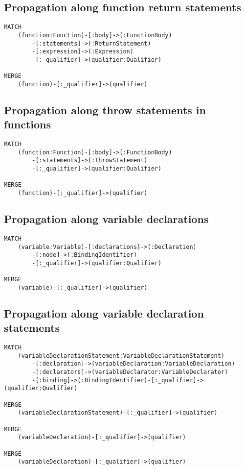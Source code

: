 \subsection{Propagation along function return statements}
\begin{lstlisting}[language=Cypher]
MATCH
    (function:Function)-[:body]->(:FunctionBody)
        -[:statements]->(:ReturnStatement)
        -[:expression]->(:Expression)
        -[:_qualifier]->(qualifier:Qualifier)

MERGE
    (function)-[:_qualifier]->(qualifier)
\end{lstlisting}


\subsection{Propagation along throw statements in functions}
\begin{lstlisting}[language=Cypher]
MATCH
    (function:Function)-[:body]->(:FunctionBody)
        -[:statements]->(:ThrowStatement)
        -[:_qualifier]->(qualifier:Qualifier)

MERGE
    (function)-[:_qualifier]->(qualifier)
\end{lstlisting}


\newpage
\subsection{Propagation along variable declarations}
\begin{lstlisting}[language=Cypher]
MATCH
    (variable:Variable)-[:declarations]->(:Declaration)
        -[:node]->(:BindingIdentifier)
        -[:_qualifier]->(qualifier:Qualifier)

MERGE
    (variable)-[:_qualifier]->(qualifier)
\end{lstlisting}


\subsection{Propagation along variable declaration statements}
\begin{lstlisting}[language=Cypher]
MATCH
    (variableDeclarationStatement:VariableDeclarationStatement)
        -[:declaration]->(variableDeclaration:VariableDeclaration)
        -[:declarators]->(variableDeclarator:VariableDeclarator)
        -[:binding]->(:BindingIdentifier)-[:_qualifier]->(qualifier:Qualifier)

MERGE
    (variableDeclarationStatement)-[:_qualifier]->(qualifier)

MERGE
    (variableDeclaration)-[:_qualifier]->(qualifier)

MERGE
    (variableDeclaration)-[:_qualifier]->(qualifier)
\end{lstlisting}


